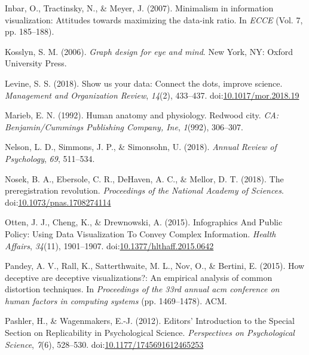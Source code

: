 \documentclass[
  man]{apa6}
\begin{document}
\leavevmode\hypertarget{ref-inbar2007minimalism}{}%
Inbar, O., Tractinsky, N., \& Meyer, J. (2007). Minimalism in information visualization: Attitudes towards maximizing the data-ink ratio. In \emph{ECCE} (Vol. 7, pp. 185--188).

\leavevmode\hypertarget{ref-Kosslyn2006e}{}%
Kosslyn, S. M. (2006). \emph{Graph design for eye and mind}. New York, NY: Oxford University Press.

\leavevmode\hypertarget{ref-Levine2018}{}%
Levine, S. S. (2018). Show us your data: Connect the dots, improve science. \emph{Management and Organization Review}, \emph{14}(2), 433--437. doi:\href{https://doi.org/10.1017/mor.2018.19}{10.1017/mor.2018.19}

\leavevmode\hypertarget{ref-marieb1992human}{}%
Marieb, E. N. (1992). Human anatomy and physiology. Redwood city. \emph{CA: Benjamin/Cummings Publishing Company, Ine}, \emph{1}(992), 306--307.

\leavevmode\hypertarget{ref-Nelson2018a}{}%
Nelson, L. D., Simmons, J. P., \& Simonsohn, U. (2018). \emph{Annual Review of Psychology}, \emph{69}, 511--534.

\leavevmode\hypertarget{ref-Nosek2018}{}%
Nosek, B. A., Ebersole, C. R., DeHaven, A. C., \& Mellor, D. T. (2018). The preregistration revolution. \emph{Proceedings of the National Academy of Sciences}. doi:\href{https://doi.org/10.1073/pnas.1708274114}{10.1073/pnas.1708274114}

\leavevmode\hypertarget{ref-Otten2015}{}%
Otten, J. J., Cheng, K., \& Drewnowski, A. (2015). Infographics And Public Policy: Using Data Visualization To Convey Complex Information. \emph{Health Affairs}, \emph{34}(11), 1901--1907. doi:\href{https://doi.org/10.1377/hlthaff.2015.0642}{10.1377/hlthaff.2015.0642}

\leavevmode\hypertarget{ref-pandey2015deceptive}{}%
Pandey, A. V., Rall, K., Satterthwaite, M. L., Nov, O., \& Bertini, E. (2015). How deceptive are deceptive visualizations?: An empirical analysis of common distortion techniques. In \emph{Proceedings of the 33rd annual acm conference on human factors in computing systems} (pp. 1469--1478). ACM.

\leavevmode\hypertarget{ref-Pashler2012a}{}%
Pashler, H., \& Wagenmakers, E.-J. (2012). Editors' Introduction to the Special Section on Replicability in Psychological Science. \emph{Perspectives on Psychological Science}, \emph{7}(6), 528--530. doi:\href{https://doi.org/10.1177/1745691612465253}{10.1177/1745691612465253}
\end{document}

